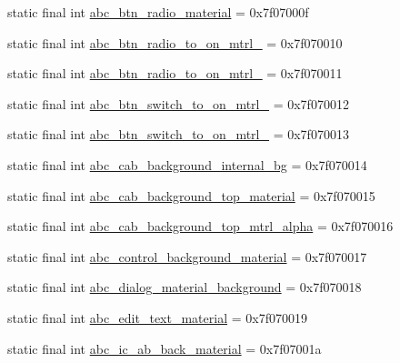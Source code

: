 \begin{DoxyCompactItemize}
static final int \mbox{\hyperlink{classandroid_1_1support_1_1design_1_1_r_1_1drawable_a0eeed1992a879d933ae3d01f9507aa81}{abc\+\_\+btn\+\_\+radio\+\_\+material}} = 0x7f07000f
\item 
static final int \mbox{\hyperlink{classandroid_1_1support_1_1design_1_1_r_1_1drawable_a72ec210aab2eff83e2f3a2880ceb665b}{abc\+\_\+btn\+\_\+radio\+\_\+to\+\_\+on\+\_\+mtrl\+\_}} = 0x7f070010
\item 
static final int \mbox{\hyperlink{classandroid_1_1support_1_1design_1_1_r_1_1drawable_acaf233b381887822038a39dd0c57da41}{abc\+\_\+btn\+\_\+radio\+\_\+to\+\_\+on\+\_\+mtrl\+\_}} = 0x7f070011
\item 
static final int \mbox{\hyperlink{classandroid_1_1support_1_1design_1_1_r_1_1drawable_ae521666a21ed2608a23eca5d22f96ee3}{abc\+\_\+btn\+\_\+switch\+\_\+to\+\_\+on\+\_\+mtrl\+\_}} = 0x7f070012
\item 
static final int \mbox{\hyperlink{classandroid_1_1support_1_1design_1_1_r_1_1drawable_a5a3b8a81295542669662242978c175f7}{abc\+\_\+btn\+\_\+switch\+\_\+to\+\_\+on\+\_\+mtrl\+\_}} = 0x7f070013
\item 
static final int \mbox{\hyperlink{classandroid_1_1support_1_1design_1_1_r_1_1drawable_a98b531b7ea20497704028ad747e030f1}{abc\+\_\+cab\+\_\+background\+\_\+internal\+\_\+bg}} = 0x7f070014
\item 
static final int \mbox{\hyperlink{classandroid_1_1support_1_1design_1_1_r_1_1drawable_a42e17569e7d1bb789f0520f927545b90}{abc\+\_\+cab\+\_\+background\+\_\+top\+\_\+material}} = 0x7f070015
\item 
static final int \mbox{\hyperlink{classandroid_1_1support_1_1design_1_1_r_1_1drawable_a41acf92ce9b10b18e42741a302b12976}{abc\+\_\+cab\+\_\+background\+\_\+top\+\_\+mtrl\+\_\+alpha}} = 0x7f070016
\item 
static final int \mbox{\hyperlink{classandroid_1_1support_1_1design_1_1_r_1_1drawable_a519683d8b9d2044003074890024582d5}{abc\+\_\+control\+\_\+background\+\_\+material}} = 0x7f070017
\item 
static final int \mbox{\hyperlink{classandroid_1_1support_1_1design_1_1_r_1_1drawable_a51203c7028bb30513590dcc5c4c3d9cd}{abc\+\_\+dialog\+\_\+material\+\_\+background}} = 0x7f070018
\item 
static final int \mbox{\hyperlink{classandroid_1_1support_1_1design_1_1_r_1_1drawable_a90fa1994eabee1df8caf70fa65975771}{abc\+\_\+edit\+\_\+text\+\_\+material}} = 0x7f070019
\item 
static final int \mbox{\hyperlink{classandroid_1_1support_1_1design_1_1_r_1_1drawable_ab1e4e8a337ffc7cb8522a649c351ccd5}{abc\+\_\+ic\+\_\+ab\+\_\+back\+\_\+material}} = 0x7f07001a

\end{DoxyCompactItemize}
